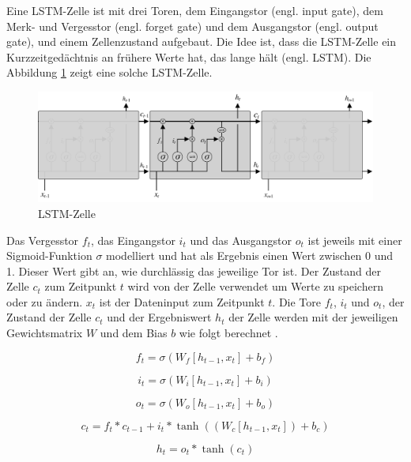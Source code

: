 Eine \ac{LSTM}-Zelle ist mit drei Toren, dem Eingangstor (engl. input gate), dem Merk- und Vergesstor (engl. forget gate) und dem Ausgangstor (engl. output gate), und einem Zellenzustand aufgebaut. Die Idee ist, dass die \ac{LSTM}-Zelle ein Kurzzeitgedächtnis an frühere Werte hat, das lange hält (engl. \acl{LSTM}). Die Abbildung \ref{fig_lstm} zeigt eine solche \ac{LSTM}-Zelle.

\begin{figure}[h]
\centering
\includegraphics[scale=0.4]{images/lstm.pdf}
\caption{\acl{LSTM}-Zelle \cite{olah2015lstm}}
\label{fig_lstm}
\end{figure}

Das Vergesstor $f_t$, das Eingangstor $i_t$ und das Ausgangstor $o_t$ ist jeweils mit einer Sigmoid-Funktion $\sigma$ modelliert und hat als Ergebnis einen Wert zwischen 0 und 1. Dieser Wert gibt an, wie durchlässig das jeweilige Tor ist. Der Zustand der Zelle $c_t$ zum Zeitpunkt $t$ wird von der Zelle verwendet um Werte zu speichern oder zu ändern. $x_t$ ist der Dateninput zum Zeitpunkt $t$. Die Tore $f_t$, $i_t$ und $o_t$, der Zustand der Zelle $c_t$ und der Ergebniswert $h_t$ der Zelle werden mit der jeweiligen Gewichtsmatrix $W$ und dem Bias $b$ wie folgt berechnet \cite{olah2015lstm}.

\begin{equation}
f_t = \sigma (W_f[h_{t-1}, x_t] + b_f)
\end{equation}

\begin{equation}
i_t = \sigma (W_i[h_{t-1}, x_t] + b_i)
\end{equation}

\begin{equation}
o_t = \sigma (W_o[h_{t-1}, x_t] + b_o)
\end{equation}

\begin{equation}
c_t = f_t * c_{t-1} + i_t * \tanh((W_c[h_{t-1}, x_t]) + b_c)
\end{equation}

\begin{equation}
h_t = o_t * \tanh(c_t)
\end{equation}


